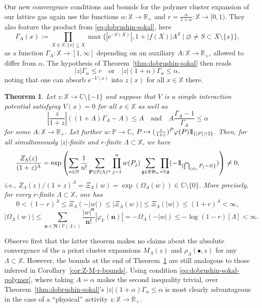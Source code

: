 \documentclass[10pt,a4paper]{amsart}
\newtheorem{theorem}{Theorem}[section]
\newcommand{\e}{\mathrm{e}}
\newcommand{\N}{\mathbb{N}}
\newcommand{\R}{\mathbb{R}}
\newcommand{\C}{\mathbb{C}}
\renewcommand{\P}{\mathbb{P}}
\newcommand{\X}{\mathbb X}
\newcommand{\be}{\begin{equation}}
\newcommand{\ee}{\end{equation}}
\def\1{{\mathchoice {1\mskip-4mu\mathrm l}      
{1\mskip-4mu\mathrm l}
{1\mskip-4.5mu\mathrm l} {1\mskip-5mu\mathrm l}}}
\begin{document}
Our new convergence conditions and bounds for the polymer cluster expansion of our lattice gas again use the functions $\alpha : \X \to \R_+$ and $r = \frac{\alpha}{1+\alpha} : \X \to [0,1)$. 
They also feature the product from \eqref{eq:dobrushin-sokal}, here
\[
	\Gamma_A(x) := \prod_{X\Subset\X : \{x\} \subsetneq X} \max\{|\e^{-V(X)}|, 1 + |f(X)| A^S \mid \varnothing \neq S \subset X \setminus \{x\}\},
\]
as a function $\Gamma_A : \X \to [1,\infty]$ depending on an auxiliary $A : \X \to \R_+$, allowed to differ from $\alpha$. 
The hypothesis of Theorem~\ref{thm:dobrushin-sokal} then reads
\[
	|z| \Gamma_\alpha \leq r \quad \text{or} \quad |z| (1+\alpha) \Gamma_\alpha \leq \alpha,
\]
noting that one can absorb $\e^{-V(x)}$ into $z(x)$ for all $x \in \X$ there.


\begin{theorem} \label{thm:dobrushin-sokal-polymer}
	Let $z : \X \to \C \setminus \{-1\}$ and suppose that $V$ is a simple interaction potential satisfying $V(x) = 0$ for all $x \in \X$ as well as
	\be \label{eq:dobrushin-sokal-polymer}
		|{\textstyle \frac{z}{1+z}}| ((1+A)\Gamma_A - A) \leq A \quad \text{and} \quad A {\textstyle \frac{\Gamma_A - 1}{\Gamma_A}} \leq \alpha
	\ee
	for some $A : \X \to \R_+$. 
	Let further $w : \P \to \C$, $P \mapsto (\frac{z}{1+z})^P \varphi(P) \1_{\{|P|\geq 2\}}$. 
	Then, for all simultaneously $|z|$-finite and $r$-finite $\Lambda \subset \X$, we have
	\[
		\frac{Z_\Lambda(z)}{(1+z)^\Lambda} = \exp\left( \sum_{n \in \N} \frac{1}{n!} \sum_{\mathbf P \in \P(\Lambda)^n} \prod_{j=1}^n w(P_j) \sum_{\mathfrak g \in \mathfrak{CG}_n} \prod_{e\in\mathfrak g} (-\1_{\{\bigcap_{j\in e} P_j = \varnothing\}}) \right) \neq 0,
	\]
	i.e., $Z_\Lambda(z) / (1+z)^\Lambda = \Xi_\Lambda(w) = \exp(\Omega_\Lambda(w)) \in \C \setminus \{0\}$. 
	More precisely, for every $r$-finite $\Lambda \subset \X$, one has
	\[
		0 < (1-r)^\Lambda \leq \Xi_\Lambda(-|w|) \leq |\Xi_\Lambda(w)| \leq \Xi_\Lambda(|w|) \leq (1+r)^\Lambda < \infty,
	\]
	\[
		|\Omega_\Lambda(w)| \leq \sum_{\mathbf n \in \mathbf N(\P(\Lambda))} \frac{|w|^\mathbf n}{\mathbf n!} |\varphi_\P(\mathbf n)| = -\Omega_\Lambda(-|w|) \leq - \log (1 - r)[\Lambda] < \infty.
	\]
\end{theorem}


Observe first that the latter theorem makes no claims about the absolute convergence of the a priori cluster expansions $M_\Lambda(z)$ and $\rho_\Lambda(\bullet, z)$ for any $\Lambda \subset \X$. 
However, the bounds at the end of Theorem~\ref{thm:dobrushin-sokal-polymer} are still analogous to those inferred in Corollary~\ref{cor:Z-M-r-bounds}.  
Using condition \eqref{eq:dobrushin-sokal-polymer}, where taking $A=\alpha$ makes the second inequality trivial, over Theorem~\ref{thm:dobrushin-sokal}'s $|z| (1+\alpha) \Gamma_\alpha \leq \alpha$ is most clearly advantageous in the case of a ``physical'' activity $z : \X \to \R_+$.
\end{document}
